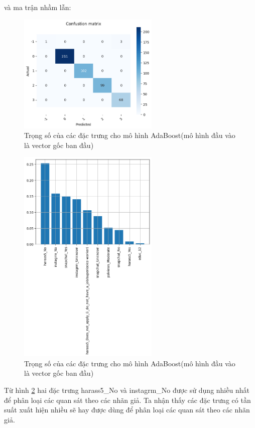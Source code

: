 \begin{enumerate}[label=(\alph*)]
    và ma trận nhầm lẫn:

    \begin{figure}[H]
        \centering
        \includegraphics[width=0.6\textwidth]{figures/Thanh/Data_Analysis/With_null_confusion_matrix_AdaBoost_original_features.png}
        \caption{Trọng số của các đặc trưng cho mô hình AdaBoost(mô hình đầu vào là vector gốc ban đầu)}
        \label{fig:With_null_confusion_matrix_AdaBoost_original_features}
    \end{figure}

    \begin{figure}[H]
        \centering
        \includegraphics[width=0.6\textwidth]{figures/Thanh/Data_Analysis/With_null_Feature_Importance_AdaBoost_original_features.png}
        \caption{Trọng số của các đặc trưng cho mô hình AdaBoost(mô hình đầu vào là vector gốc ban đầu)}
        \label{fig:With_null_Feature_Importance_AdaBoost_original_features}
    \end{figure}

    Từ hình \ref{fig:With_null_Feature_Importance_AdaBoost_original_features} hai đặc trưng harass5\_No và instagrm\_No được sử dụng nhiều
    nhất để phân loại các quan sát theo các nhãn giả. Ta nhận thấy các đặc trưng có tần suất xuất hiện nhiều sẽ hay được dùng để phân loại các quan sát theo các nhãn giả.
\end{enumerate}

